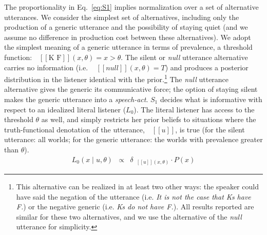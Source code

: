 \documentclass[12pt,letterpaper]{article}
\newcommand{\denote}[1]{\mbox{ $[\![ #1 ]\!]$}}
\begin{document}
The proportionality in Eq.~\ref{eq:S1} implies normalization over a set of alternative utterances.
We consider the simplest set of alternatives, including only the production of a generic utterance and the possibility of staying quiet (and we assume no difference in production cost between these alternatives). 
We adopt the simplest meaning of a generic utterance in terms of prevalence, a threshold function: $\denote{\text{K F}}(x, \theta)=x>\theta$.
The silent or \emph{null} utterance alternative carries no information (i.e.~$\denote{null}(x, \theta)=T$) and produces a posterior distribution in the listener identical with the prior.\footnote{
This alternative can be realized in at least two other ways: the speaker could have said the negation of the utterance (i.e. \emph{It is not the case that Ks have F.}) or the negative generic (i.e. \emph{Ks do not have F.}). All results reported are similar for these two alternatives, and we use the alternative of the \emph{null} utterance for simplicity.
}
The \emph{null} utterance alternative gives the generic its communicative force; the option of staying silent makes the generic utterance into a \emph{speech-act}.
%
%
%
$S_1$ decides what is informative with respect to an idealized literal listener ($L_{0}$).
The literal listener has access to the threshold $\theta$ as well, and simply restricts her prior beliefs to situations where the truth-functional denotation of the utterance, $\denote{u}$, is true (for the silent utterance: all worlds; for the generic utterance: the worlds with prevalence greater than $\theta$).
%
\begin{eqnarray}
L_{0}(x \mid u, \theta) &\propto& {\delta_{\denote{u}(x, \theta)} \cdot P(x)} \label{eq:L0}
\end{eqnarray}
%
\end{document}

